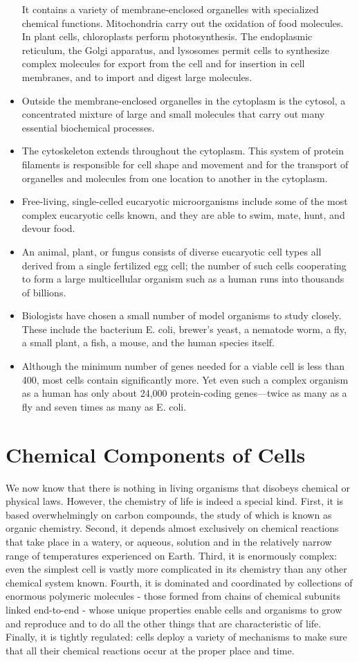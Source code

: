 \begin{itemize}
It contains a variety of membrane-enclosed organelles with specialized chemical functions. Mitochondria carry out the oxidation of food
molecules. In plant cells, chloroplasts perform photosynthesis. The
endoplasmic reticulum, the Golgi apparatus, and lysosomes permit cells to synthesize complex molecules for export from the cell
and for insertion in cell membranes, and to import and digest large
molecules.
\item Outside the membrane-enclosed organelles in the cytoplasm is the
cytosol, a concentrated mixture of large and small molecules that
carry out many essential biochemical processes.
\item The cytoskeleton extends throughout the cytoplasm. This system of
protein filaments is responsible for cell shape and movement and
for the transport of organelles and molecules from one location to
another in the cytoplasm.
\item Free-living, single-celled eucaryotic microorganisms include some of
the most complex eucaryotic cells known, and they are able to swim,
mate, hunt, and devour food.
\item An animal, plant, or fungus consists of diverse eucaryotic cell types
all derived from a single fertilized egg cell; the number of such cells
cooperating to form a large multicellular organism such as a human
runs into thousands of billions.
\item Biologists have chosen a small number of model organisms to study
closely. These include the bacterium E. coli, brewer’s yeast, a nematode worm, a fly, a small plant, a fish, a mouse, and the human
species itself.
\item Although the minimum number of genes needed for a viable cell is
less than 400, most cells contain significantly more. Yet even such a
complex organism as a human has only about 24,000 protein-coding
genes—twice as many as a fly and seven times as many as E. coli.
\end{itemize}

\chapter{Chemical Components of Cells}

We now know that there is nothing in living organisms that disobeys
chemical or physical laws. However, the chemistry of life is indeed a
special kind. First, it is based overwhelmingly on carbon compounds,
the study of which is known as organic chemistry. Second, it depends
almost exclusively on chemical reactions that take place in a watery,
or aqueous, solution and in the relatively narrow range of temperatures
experienced on Earth. Third, it is enormously complex: even the simplest
cell is vastly more complicated in its chemistry than any other chemical
system known. Fourth, it is dominated and coordinated by collections of
enormous polymeric molecules - those formed from chains of chemical
subunits linked end-to-end - whose unique properties enable cells and
organisms to grow and reproduce and to do all the other things that are
characteristic of life. Finally, it is tightly regulated: cells deploy a variety
of mechanisms to make sure that all their chemical reactions occur at the
proper place and time.

